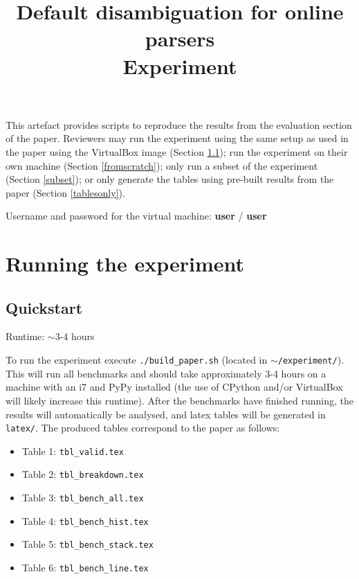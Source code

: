 \documentclass[12pt,a4paper]{article}
\begin{document}
\title{Default disambiguation for online parsers\\Experiment}
\maketitle

This artefact provides scripts to reproduce the results from the evaluation
section of the paper. Reviewers may run the experiment using the same setup as
used in the paper using the VirtualBox image (Section \ref{quickstart}); run
the experiment on their own machine (Section \ref{fromscratch}); only run a
subset of the experiment (Section \ref{subset}); or only generate the tables
using pre-built results from the paper (Section \ref{tablesonly}).

\noindent Username and password for the virtual machine: \textbf{user} / \textbf{user}

\section{Running the experiment}

\subsection{Quickstart}
\label{quickstart}

Runtime: $\sim$3-4 hours

\noindent To run the experiment execute \texttt{./build\_paper.sh} (located in
\texttt{$\sim$/experiment/}). This will run all benchmarks and should take
approximately 3-4 hours on a machine with an i7 and PyPy installed (the use of
CPython and/or VirtualBox will likely increase this runtime). After the
benchmarks have finished running, the results will automatically be analysed,
and latex tables will be generated in \texttt{latex/}. The produced tables
correspond to the paper as follows:

\begin{itemize}
    \item Table 1: \texttt{tbl\_valid.tex}
    \item Table 2: \texttt{tbl\_breakdown.tex}
    \item Table 3: \texttt{tbl\_bench\_all.tex}
    \item Table 4: \texttt{tbl\_bench\_hist.tex}
    \item Table 5: \texttt{tbl\_bench\_stack.tex}
    \item Table 6: \texttt{tbl\_bench\_line.tex}
\end{itemize}
\end{document}
